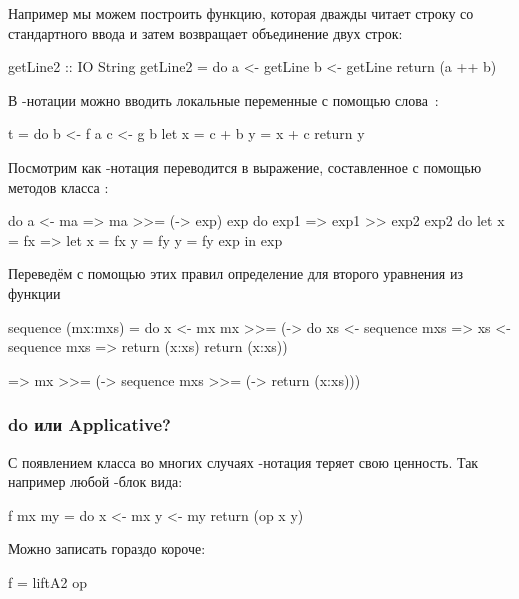 Например мы можем построить функцию, которая дважды
читает строку со стандартного ввода и затем возвращает
объединение двух строк:

\begin{code}
getLine2 :: IO String
getLine2 = do
    a <- getLine
    b <- getLine
    return (a ++ b)
\end{code}

В -нотации можно вводить локальные переменные 
с помощью \mbox{слова }:

\begin{code}
t = do
    b <- f a
    c <- g b
    let x = c + b
        y = x + c
    return y
\end{code}

Посмотрим как -нотация переводится в выражение, 
составленное с помощью методов класса :

\begin{code}
do
    a <- ma     =>   ma >>= (\a -> exp)
    exp
do
    exp1        =>   exp1 >> exp2
    exp2    
do
    let x = fx  =>   let x = fx
        y = fy           y = fy
    exp              in  exp
\end{code}

Переведём с помощью этих правил определение для 
второго уравнения из функции 

\begin{code}
sequence (mx:mxs) = do
    x   <- mx                  mx >>= (\x -> do  
    xs  <- sequence mxs   =>              xs <- sequence mxs    =>    
    return (x:xs)                         return (x:xs))

=>     mx >>= (\x -> sequence mxs >>= (\xs -> return (x:xs)))
\end{code}

\subsubsection{do или Applicative?}

С появлением класса  во многих 
случаях -нотация теряет свою ценность. 
Так например любой -блок вида:

\begin{code}
f mx my = do
    x <- mx 
    y <- my
    return (op x y)
\end{code}

Можно записать гораздо короче:

\begin{code}
f = liftA2 op 
\end{code}

